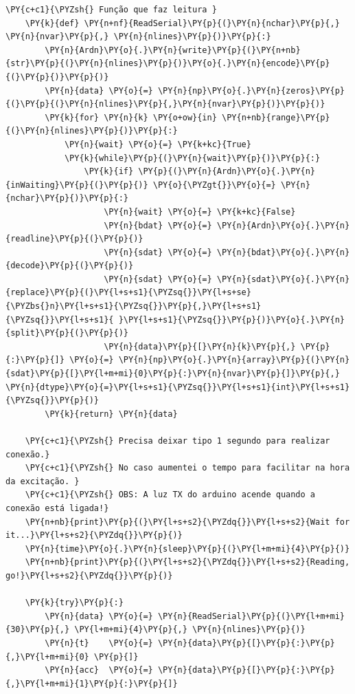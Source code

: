 \begin{tcolorbox}[breakable, size=fbox, boxrule=1pt, pad at break*=1mm,colback=cellbackground, colframe=cellborder]
\begin{Verbatim}[commandchars=\\\{\}]
    \PY{c+c1}{\PYZsh{} Função que faz leitura }
    \PY{k}{def} \PY{n+nf}{ReadSerial}\PY{p}{(}\PY{n}{nchar}\PY{p}{,} \PY{n}{nvar}\PY{p}{,} \PY{n}{nlines}\PY{p}{)}\PY{p}{:}
        \PY{n}{Ardn}\PY{o}{.}\PY{n}{write}\PY{p}{(}\PY{n+nb}{str}\PY{p}{(}\PY{n}{nlines}\PY{p}{)}\PY{o}{.}\PY{n}{encode}\PY{p}{(}\PY{p}{)}\PY{p}{)}
        \PY{n}{data} \PY{o}{=} \PY{n}{np}\PY{o}{.}\PY{n}{zeros}\PY{p}{(}\PY{p}{(}\PY{n}{nlines}\PY{p}{,}\PY{n}{nvar}\PY{p}{)}\PY{p}{)}
        \PY{k}{for} \PY{n}{k} \PY{o+ow}{in} \PY{n+nb}{range}\PY{p}{(}\PY{n}{nlines}\PY{p}{)}\PY{p}{:}
            \PY{n}{wait} \PY{o}{=} \PY{k+kc}{True}
            \PY{k}{while}\PY{p}{(}\PY{n}{wait}\PY{p}{)}\PY{p}{:}
                \PY{k}{if} \PY{p}{(}\PY{n}{Ardn}\PY{o}{.}\PY{n}{inWaiting}\PY{p}{(}\PY{p}{)} \PY{o}{\PYZgt{}}\PY{o}{=} \PY{n}{nchar}\PY{p}{)}\PY{p}{:}
                    \PY{n}{wait} \PY{o}{=} \PY{k+kc}{False}
                    \PY{n}{bdat} \PY{o}{=} \PY{n}{Ardn}\PY{o}{.}\PY{n}{readline}\PY{p}{(}\PY{p}{)} 
                    \PY{n}{sdat} \PY{o}{=} \PY{n}{bdat}\PY{o}{.}\PY{n}{decode}\PY{p}{(}\PY{p}{)}
                    \PY{n}{sdat} \PY{o}{=} \PY{n}{sdat}\PY{o}{.}\PY{n}{replace}\PY{p}{(}\PY{l+s+s1}{\PYZsq{}}\PY{l+s+se}{\PYZbs{}n}\PY{l+s+s1}{\PYZsq{}}\PY{p}{,}\PY{l+s+s1}{\PYZsq{}}\PY{l+s+s1}{ }\PY{l+s+s1}{\PYZsq{}}\PY{p}{)}\PY{o}{.}\PY{n}{split}\PY{p}{(}\PY{p}{)}
                    \PY{n}{data}\PY{p}{[}\PY{n}{k}\PY{p}{,} \PY{p}{:}\PY{p}{]} \PY{o}{=} \PY{n}{np}\PY{o}{.}\PY{n}{array}\PY{p}{(}\PY{n}{sdat}\PY{p}{[}\PY{l+m+mi}{0}\PY{p}{:}\PY{n}{nvar}\PY{p}{]}\PY{p}{,} \PY{n}{dtype}\PY{o}{=}\PY{l+s+s1}{\PYZsq{}}\PY{l+s+s1}{int}\PY{l+s+s1}{\PYZsq{}}\PY{p}{)}
        \PY{k}{return} \PY{n}{data}

    \PY{c+c1}{\PYZsh{} Precisa deixar tipo 1 segundo para realizar conexão.}
    \PY{c+c1}{\PYZsh{} No caso aumentei o tempo para facilitar na hora da excitação. }
    \PY{c+c1}{\PYZsh{} OBS: A luz TX do arduino acende quando a conexão está ligada!}
    \PY{n+nb}{print}\PY{p}{(}\PY{l+s+s2}{\PYZdq{}}\PY{l+s+s2}{Wait for it...}\PY{l+s+s2}{\PYZdq{}}\PY{p}{)}
    \PY{n}{time}\PY{o}{.}\PY{n}{sleep}\PY{p}{(}\PY{l+m+mi}{4}\PY{p}{)}
    \PY{n+nb}{print}\PY{p}{(}\PY{l+s+s2}{\PYZdq{}}\PY{l+s+s2}{Reading, go!}\PY{l+s+s2}{\PYZdq{}}\PY{p}{)}

    \PY{k}{try}\PY{p}{:}
        \PY{n}{data} \PY{o}{=} \PY{n}{ReadSerial}\PY{p}{(}\PY{l+m+mi}{30}\PY{p}{,} \PY{l+m+mi}{4}\PY{p}{,} \PY{n}{nlines}\PY{p}{)}
        \PY{n}{t}    \PY{o}{=} \PY{n}{data}\PY{p}{[}\PY{p}{:}\PY{p}{,}\PY{l+m+mi}{0} \PY{p}{]}
        \PY{n}{acc}  \PY{o}{=} \PY{n}{data}\PY{p}{[}\PY{p}{:}\PY{p}{,}\PY{l+m+mi}{1}\PY{p}{:}\PY{p}{]}


\end{Verbatim}
\end{tcolorbox}
